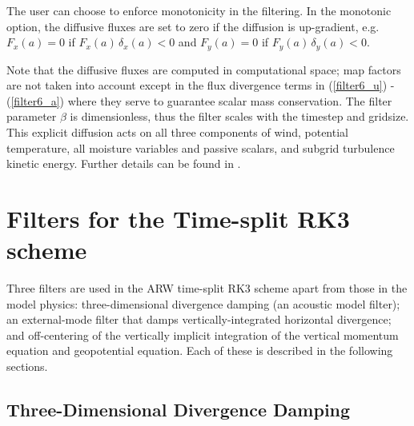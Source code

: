 The user can choose to enforce monotonicity in the filtering.  In the
monotonic option, the diffusive fluxes are set to zero if the diffusion is up-gradient, e.g. $F_x(a) = 0$ if $F_x (a) \, \delta_x(a) < 0$ and  $F_y(a) = 0$ if $F_y (a) \, \delta_y(a) < 0$.   

Note that the diffusive fluxes are computed in
computational space; map factors are not taken into account except in the flux divergence terms in (\ref{filter6_u}) - (\ref{filter6_a}) where they serve to guarantee scalar mass conservation.
The filter parameter $\beta$ is dimensionless, thus the filter
scales with the timestep and gridsize.  This explicit diffusion acts on all three components of wind,
potential temperature, all moisture variables and passive scalars, and
subgrid turbulence kinetic energy.  Further details can be found in
\cite{knievel.et.al.2007}.

%
%

\section{Filters for the Time-split RK3 scheme}

Three filters are used in the ARW time-split RK3
scheme apart from those in the model physics: three-dimensional
divergence damping (an acoustic model filter); an external-mode filter
that damps vertically-integrated horizontal divergence; and off-centering
of the vertically implicit integration of the vertical momentum
equation and geopotential equation.  Each of these is described in the
following sections.

\subsection{Three-Dimensional Divergence Damping}

